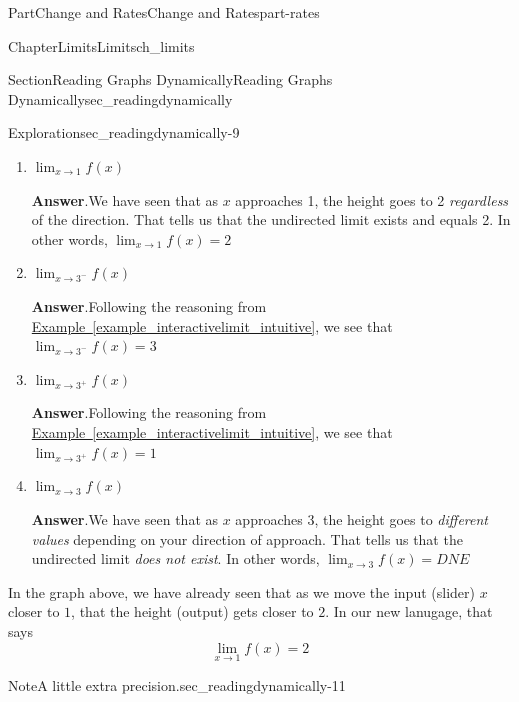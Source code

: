 \documentclass[oneside,10pt,]{tufte-book}
\newcommand{\blocktitlefont}{\relax}
\newcommand{\xreffont}{\relax}
\numberwithin{equation}{chapter}
\begin{document}
\begin{partptx}{Part}{Change and Rates}{}{Change and Rates}{}{}{part-rates}
\begin{chapterptx}{Chapter}{Limits}{}{Limits}{}{}{ch_limits}
\begin{sectionptx}{Section}{Reading Graphs Dynamically}{}{Reading Graphs Dynamically}{}{}{sec_readingdynamically}
\begin{exploration}{Exploration}{}{sec_readingdynamically-9}
\begin{enumerate}[font=\bfseries,label=(\alph*),ref=\alph*]
\par\smallskip%
\noindent\textbf{\blocktitlefont Answer}.\hypertarget{sec_readingdynamically-9-3-2}{}\quad{}Following the reasoning from \hyperref[example_interactivelimit_intuitive]{Example~{\xreffont\ref{example_interactivelimit_intuitive}}}, we see that \(\lim_{x\rightarrow 1^+} f(x)=2\)%
\item{}\(\displaystyle \lim_{x\rightarrow 1} f(x)\)%
\par\smallskip%
\noindent\textbf{\blocktitlefont Answer}.\hypertarget{sec_readingdynamically-9-4-2}{}\quad{}We have seen that as \(x\) approaches 1, the height goes to 2 \emph{regardless} of the direction.  That tells us that the undirected limit exists and equals 2.  In other words, \(\lim_{x\rightarrow 1} f(x)=2\)%
\item{}\(\displaystyle \lim_{x\rightarrow 3^-} f(x)\)%
\par\smallskip%
\noindent\textbf{\blocktitlefont Answer}.\hypertarget{sec_readingdynamically-9-5-2}{}\quad{}Following the reasoning from \hyperref[example_interactivelimit_intuitive]{Example~{\xreffont\ref{example_interactivelimit_intuitive}}}, we see that \(\lim_{x\rightarrow 3^-} f(x)=3\)%
\item{}\(\displaystyle \lim_{x\rightarrow 3^+} f(x)\)%
\par\smallskip%
\noindent\textbf{\blocktitlefont Answer}.\hypertarget{sec_readingdynamically-9-6-2}{}\quad{}Following the reasoning from \hyperref[example_interactivelimit_intuitive]{Example~{\xreffont\ref{example_interactivelimit_intuitive}}}, we see that \(\lim_{x\rightarrow 3^+} f(x)=1\)%
\item{}\(\displaystyle \lim_{x\rightarrow 3} f(x)\)%
\par\smallskip%
\noindent\textbf{\blocktitlefont Answer}.\hypertarget{sec_readingdynamically-9-7-2}{}\quad{}We have seen that as \(x\) approaches 3, the height goes to \emph{different values} depending on your direction of approach.  That tells us that the undirected limit \emph{does not exist}.  In other words, \(\lim_{x\rightarrow 3} f(x)= DNE\)%
\end{enumerate}%
\end{exploration}%
In the graph above, we have already seen that as we move the input (slider) \(x\) closer to \(1\), that the height (output) gets closer to \(2\).  In our new lanugage, that says%
\begin{equation*}
\lim_{x\rightarrow 1} f(x) = 2
\end{equation*}
%
\begin{note}{Note}{A little extra precision.}{sec_readingdynamically-11}%

\end{note}
\end{sectionptx}
\end{chapterptx}
\end{partptx}
\end{document}
